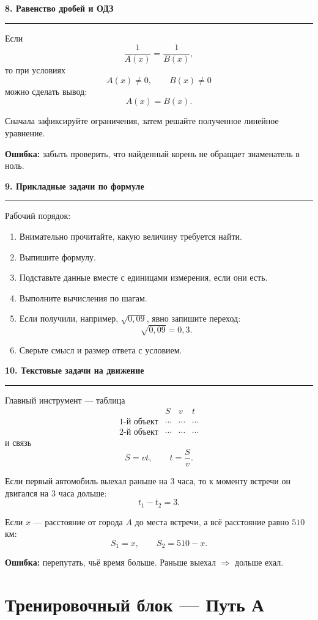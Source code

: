\documentclass[a4paper,12pt]{article}
\newcommand{\topic}[1]{%
  \Needspace{8\baselineskip}%
  \vspace{0.6em}
  {\Large\bfseries\color{darkaccent}#1}\par
  \vspace{0.25em}
  {\color{accent}\rule{\linewidth}{0.6pt}}\par
  \vspace{0.3em}
}
\newcommand{\mistake}[1]{\textbf{\color{warn}Ошибка:} #1}
\begin{document}
\topic{8. Равенство дробей и ОДЗ}

Если
\[
\frac{1}{A(x)}=\frac{1}{B(x)},
\]
то при условиях
\[
A(x)\ne0,\qquad B(x)\ne0
\]
можно сделать вывод:
\[
A(x)=B(x).
\]

Сначала зафиксируйте ограничения, затем решайте полученное линейное уравнение.

\mistake{забыть проверить, что найденный корень не обращает знаменатель в ноль.}

\topic{9. Прикладные задачи по формуле}

Рабочий порядок:
\begin{enumerate}
  \item Внимательно прочитайте, какую величину требуется найти.
  \item Выпишите формулу.
  \item Подставьте данные вместе с единицами измерения, если они есть.
  \item Выполните вычисления по шагам.
  \item Если получили, например, \(\sqrt{0{,}09}\), явно запишите переход:
  \[
  \sqrt{0{,}09}=0{,}3.
  \]
  \item Сверьте смысл и размер ответа с условием.
\end{enumerate}

\topic{10. Текстовые задачи на движение}

Главный инструмент --- таблица
\[
\begin{array}{c|c|c|c}
 & S & v & t\\
\hline
\text{1-й объект} & \cdots & \cdots & \cdots\\
\text{2-й объект} & \cdots & \cdots & \cdots
\end{array}
\]
и связь
\[
S=vt,\qquad t=\frac{S}{v}.
\]

Если первый автомобиль выехал раньше на \(3\) часа, то к моменту встречи он двигался на \(3\) часа дольше:
\[
t_1-t_2=3.
\]

Если \(x\) --- расстояние от города \(A\) до места встречи, а всё расстояние равно \(510\) км:
\[
S_1=x,\qquad S_2=510-x.
\]

\mistake{перепутать, чьё время больше. Раньше выехал \(\Rightarrow\) дольше ехал.}

\clearpage

\section*{\color{darkaccent}Тренировочный блок --- Путь А}
\end{document}
